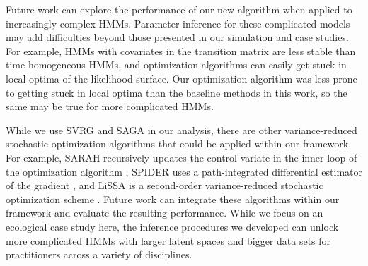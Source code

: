 Future work can explore the performance of our new algorithm when applied to increasingly complex HMMs. Parameter inference for these complicated models may add difficulties beyond those presented in our simulation and case studies. For example, HMMs with covariates in the transition matrix are less stable than time-homogeneous HMMs, and optimization algorithms can easily get stuck in local optima of the likelihood surface. Our optimization algorithm was less prone to getting stuck in local optima than the baseline methods in this work, so the same may be true for more complicated HMMs.

While we use SVRG and SAGA in our analysis, there are other variance-reduced stochastic optimization algorithms that could be applied within our framework. For example, SARAH recursively updates the control variate in the inner loop of the optimization algorithm \citep{Nguyen:2017}, SPIDER uses a path-integrated differential estimator of the gradient \citep{Fang:2018}, and LiSSA is a second-order variance-reduced stochastic optimization scheme \citep{Agarwal:2017}. Future work can integrate these algorithms within our framework and evaluate the resulting performance. While we focus on an ecological case study here, the inference procedures we developed can unlock more complicated HMMs with larger latent spaces and bigger data sets for practitioners across a variety of disciplines.